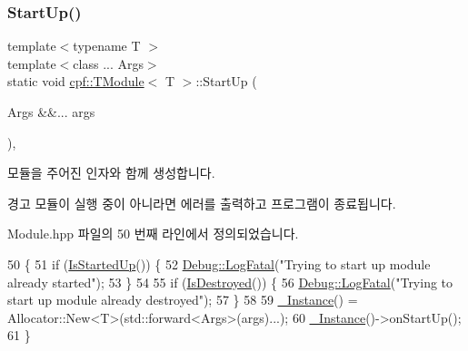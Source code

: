 \subsubsection{\texorpdfstring{Start\+Up()}{StartUp()}\hspace{0.1cm}{\footnotesize\ttfamily [1/2]}}
{\footnotesize\ttfamily template$<$typename T $>$ \\
template$<$class ... Args$>$ \\
static void \hyperlink{classcpf_1_1_t_module}{cpf\+::\+T\+Module}$<$ T $>$\+::Start\+Up (\begin{DoxyParamCaption}\item[{Args \&\&...}]{args }\end{DoxyParamCaption})\hspace{0.3cm}{\ttfamily [inline]}, {\ttfamily [static]}}

모듈을 주어진 인자와 함께 생성합니다. \begin{DoxyWarning}{경고}
모듈이 실행 중이 아니라면 에러를 출력하고 프로그램이 종료됩니다. 
\end{DoxyWarning}


Module.\+hpp 파일의 50 번째 라인에서 정의되었습니다.


\begin{DoxyCode}
50                                             \{
51             \textcolor{keywordflow}{if} (\hyperlink{classcpf_1_1_t_module_a73732afee7131dad652bf3e00c75cef9}{IsStartedUp}()) \{
52                 \hyperlink{classcpf_1_1_debug_a22849847c74bcb444922c263c9ae6183}{Debug::LogFatal}(\textcolor{stringliteral}{"Trying to start up module already started"});
53             \}
54 
55             \textcolor{keywordflow}{if} (\hyperlink{classcpf_1_1_t_module_a9f70f0a70ac59b13b7a874f82c877337}{IsDestroyed}()) \{
56                 \hyperlink{classcpf_1_1_debug_a22849847c74bcb444922c263c9ae6183}{Debug::LogFatal}(\textcolor{stringliteral}{"Trying to start up module already destroyed"});
57             \}
58 
59             \hyperlink{classcpf_1_1_t_module_a06ab8af8ea6b294959937fd2bbc1e615}{\_Instance}() = Allocator::New<T>(std::forward<Args>(args)...);
60             \hyperlink{classcpf_1_1_t_module_a06ab8af8ea6b294959937fd2bbc1e615}{\_Instance}()->onStartUp();
61         \}
\end{DoxyCode}
\mbox{\label{classcpf_1_1_t_module_ac553266ad6255da045ef3f34b0f9bc16}} 
